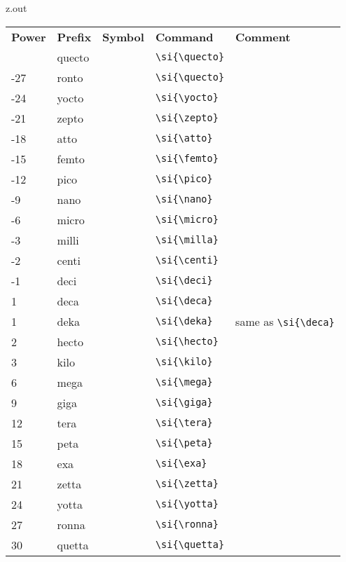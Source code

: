 \MyIO

\begin{VerbatimOut}{z.out}

\begin{tabular}{@{}mllll@{}}
  \multicolumn{1}{l}{\bfseries Power}&
    \bfseries Prefix&
    \bfseries Symbol&
    \bfseries Command&
    \bfseries Comment\\
  \tabularspace
  -30& quecto& \unit{\quecto\nounit}& \verb+\si{\quecto}+\\
  -27& ronto&  \unit{\ronto\nounit}&  \verb+\si{\quecto}+\\
  -24& yocto&  \unit{\yocto\nounit}&  \verb+\si{\yocto}+\\
  -21& zepto&  \unit{\zepto\nounit}&  \verb+\si{\zepto}+\\
  -18& atto&   \unit{\atto\nounit}&   \verb+\si{\atto}+\\
  -15& femto&  \unit{\femto\nounit}&  \verb+\si{\femto}+\\
  -12& pico&   \unit{\pico\nounit}&   \verb+\si{\pico}+\\
   -9& nano&   \unit{\nano\nounit}&   \verb+\si{\nano}+\\
   -6& micro&  \unit{\micro\nounit}&  \verb+\si{\micro}+\\
   -3& milli&  \unit{\milli\nounit}&  \verb+\si{\milla}+\\
   -2& centi&  \unit{\centi\nounit}&  \verb+\si{\centi}+\\
   -1& deci&   \unit{\deci\nounit}&   \verb+\si{\deci}+\\
    1& deca&   \unit{\deca\nounit}&   \verb+\si{\deca}+\\
    1& deka&   \unit{\deka\nounit}&   \verb+\si{\deka}+& same as \verb+\si{\deca}+\\
    2& hecto&  \unit{\hecto\nounit}&  \verb+\si{\hecto}+\\
    3& kilo&   \unit{\kilo\nounit}&   \verb+\si{\kilo}+\\
    6& mega&   \unit{\mega\nounit}&   \verb+\si{\mega}+\\
    9& giga&   \unit{\giga\nounit}&   \verb+\si{\giga}+\\
   12& tera&   \unit{\tera\nounit}&   \verb+\si{\tera}+\\
   15& peta&   \unit{\peta\nounit}&   \verb+\si{\peta}+\\
   18& exa&    \unit{\exa\nounit}&    \verb+\si{\exa}+\\
   21& zetta&  \unit{\zetta\nounit}&  \verb+\si{\zetta}+\\
   24& yotta&  \unit{\yotta\nounit}&  \verb+\si{\yotta}+\\
   27& ronna&  \unit{\ronna\nounit}&  \verb+\si{\ronna}+\\
   30& quetta& \unit{\quetta\nounit}& \verb+\si{\quetta}+\\
\end{tabular}
\end{VerbatimOut}

